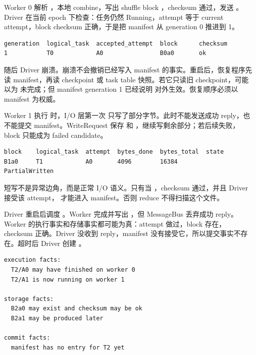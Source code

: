 Worker 0 解析 ，本地 combine，写出 shuffle block ，checksum 通过，发送 。Driver 在当前 epoch 下检查：任务仍然 Running，attempt 等于 current attempt，block checksum 正确，于是把 manifest 从 generation 0 推进到 1。

\begin{lstlisting}[numbers=none,caption={T0 提交后的 manifest}]
generation  logical_task  accepted_attempt  block      checksum
1           T0            A0                B0a0       ok
\end{lstlisting}

随后 Driver 崩溃。崩溃不会撤销已经写入 manifest 的事实。重启后，恢复程序先读 manifest，再读 checkpoint 或 task table 快照。若它只读旧 checkpoint，可能以为  未完成；但 manifest generation 1 已经说明  对外生效。恢复顺序必须以 manifest 为权威。

Worker 1 执行  时，I/O 层第一次  只写了部分字节。此时不能发送成功 reply，也不能提交 manifest。WriteRequest 保存  和 ，继续写剩余部分；若后续失败，block 只能成为 failed candidate。

\begin{lstlisting}[numbers=none,caption={T1 短写时的 block table}]
block    logical_task  attempt  bytes_done  bytes_total  state
B1a0     T1            A0       4096        16384        PartialWritten
\end{lstlisting}

短写不是异常边角，而是正常 I/O 语义。只有当 ，checksum 通过，并且 Driver 接受该 attempt， 才能进入 manifest。否则 reduce 不得扫描这个文件。

Driver 重启后调度 。Worker 完成并写出 ，但 MessageBus 丢弃成功 reply。Worker 的执行事实和存储事实都可能为真：attempt 做过，block 存在，checksum 正确。Driver 没收到 reply，manifest 没有接受它，所以提交事实不存在。超时后 Driver 创建 。

\begin{lstlisting}[numbers=none,caption={T2 超时重试时的三类事实}]
execution facts:
  T2/A0 may have finished on worker 0
  T2/A1 is now running on worker 1

storage facts:
  B2a0 may exist and checksum may be ok
  B2a1 may be produced later

commit facts:
  manifest has no entry for T2 yet
\end{lstlisting}

